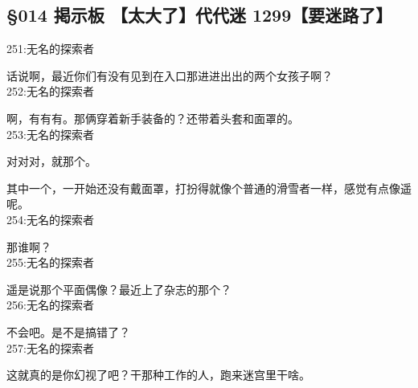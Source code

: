 \subsection{§014 掲示板 【太大了】代代迷 1299【要迷路了】}

251:无名的探索者

话说啊，最近你们有没有见到在入口那进进出出的两个女孩子啊？\\

252:无名的探索者

啊，有有有。那俩穿着新手装备的？还带着头套和面罩的。\\

253:无名的探索者

对对对，就那个。

其中一个，一开始还没有戴面罩，打扮得就像个普通的滑雪者一样，感觉有点像遥呢。\\

254:无名的探索者

那谁啊？\\

255:无名的探索者

遥是说那个平面偶像？最近上了杂志的那个？\\

256:无名的探索者

不会吧。是不是搞错了？\\

257:无名的探索者

这就真的是你幻视了吧？干那种工作的人，跑来迷宫里干啥。

